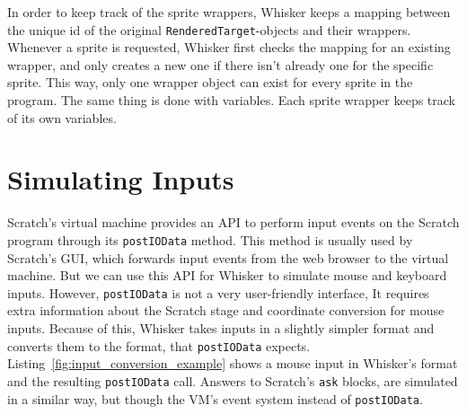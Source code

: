 In order to keep track of the sprite wrappers,
Whisker keeps a mapping between the unique id of the original \texttt{RenderedTarget}-objects and their wrappers.
Whenever a sprite is requested, Whisker first checks the mapping for an existing wrapper,
and only creates a new one if there isn't already one for the specific sprite.
This way, only one wrapper object can exist for every sprite in the program.
The same thing is done with variables.
Each sprite wrapper keeps track of its own variables.

\section{Simulating Inputs}
\label{sec:simulating_inputs}


Scratch's virtual machine provides an API to perform input events on the Scratch program through its \texttt{postIOData} method.
This method is usually used by Scratch's GUI, which forwards input events from the web browser to the virtual machine.
But we can use this API for Whisker to simulate mouse and keyboard inputs.
However, \texttt{postIOData} is not a very user-friendly interface,
It requires extra information about the Scratch stage and coordinate conversion for mouse inputs.
Because of this, Whisker takes inputs in a slightly simpler format and converts them to the format, that \texttt{postIOData} expects.
Listing~\ref{fig:input_conversion_example} shows a mouse input in Whisker's format and the resulting \texttt{postIOData} call.
Answers to Scratch's \texttt{ask} blocks, are simulated in a similar way, but though the VM's event system instead of \texttt{postIOData}.
\parspace

